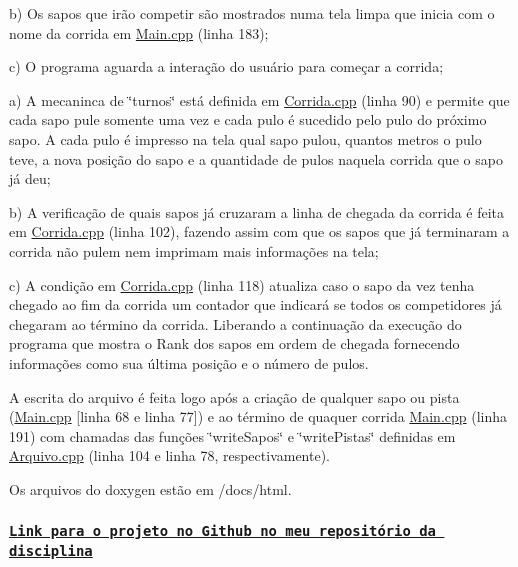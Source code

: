\begin{DoxyEnumerate}
\item b) Os sapos que irão competir são mostrados numa tela limpa que inicia com o nome da corrida em \mbox{\hyperlink{_main_8cpp}{Main.\+cpp}} (linha 183);
\end{DoxyEnumerate}
\begin{DoxyEnumerate}
\item c) O programa aguarda a interação do usuário para começar a corrida;
\item a) A mecaninca de \char`\"{}turnos\char`\"{} está definida em \mbox{\hyperlink{_corrida_8cpp}{Corrida.\+cpp}} (linha 90) e permite que cada sapo pule somente uma vez e cada pulo é sucedido pelo pulo do próximo sapo. A cada pulo é impresso na tela qual sapo pulou, quantos metros o pulo teve, a nova posição do sapo e a quantidade de pulos naquela corrida que o sapo já deu;
\end{DoxyEnumerate}
\begin{DoxyEnumerate}
\item b) A verificação de quais sapos já cruzaram a linha de chegada da corrida é feita em \mbox{\hyperlink{_corrida_8cpp}{Corrida.\+cpp}} (linha 102), fazendo assim com que os sapos que já terminaram a corrida não pulem nem imprimam mais informações na tela;
\end{DoxyEnumerate}
\begin{DoxyEnumerate}
\item c) A condição em \mbox{\hyperlink{_corrida_8cpp}{Corrida.\+cpp}} (linha 118) atualiza caso o sapo da vez tenha chegado ao fim da corrida um contador que indicará se todos os competidores já chegaram ao término da corrida. Liberando a continuação da execução do programa que mostra o Rank dos sapos em ordem de chegada fornecendo informações como sua última posição e o número de pulos.
\item A escrita do arquivo é feita logo após a criação de qualquer sapo ou pista (\mbox{\hyperlink{_main_8cpp}{Main.\+cpp}} \mbox{[}linha 68 e linha 77\mbox{]}) e ao término de quaquer corrida \mbox{\hyperlink{_main_8cpp}{Main.\+cpp}} (linha 191) com chamadas das funções \char`\"{}write\+Sapos\char`\"{} e \char`\"{}write\+Pistas\char`\"{} definidas em \mbox{\hyperlink{_arquivo_8cpp}{Arquivo.\+cpp}} (linha 104 e linha 78, respectivamente).
\end{DoxyEnumerate}

Os arquivos do doxygen estão em /docs/html.

\subsubsection*{\href{https://github.com/abmaeld/LPI/tree/master/PR03}{\tt Link para o projeto no Github no meu repositório da disciplina}}